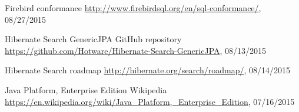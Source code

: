 \begin{thebibliography}{100}
	 Firebird conformance
	\url{http://www.firebirdsql.org/en/sql-conformance/}, 08/27/2015

	 Hibernate Search GenericJPA GitHub repository
	\url{https://github.com/Hotware/Hibernate-Search-GenericJPA}, 08/13/2015

	 Hibernate Search roadmap
	\url{http://hibernate.org/search/roadmap/}, 08/14/2015

	 Java Platform, Enterprise Edition
	Wikipedia
	\url{https://en.wikipedia.org/wiki/Java_Platform,_Enterprise_Edition}, 07/16/2015


\end{thebibliography}

\newpage{\pagestyle{empty}\cleardoublepage}